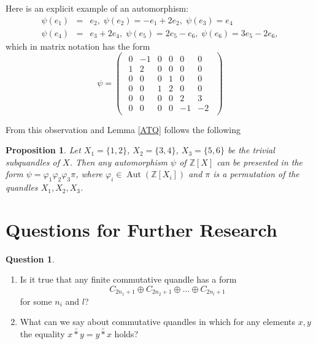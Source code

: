 \documentclass[12pt]{amsart}
\newtheorem{pro}[thm]{Proposition}
\theoremstyle{definition}
\newtheorem{qst}[thm]{Question}
\theoremstyle{remark}
\newcommand{\Z}{\mathbb{Z}}
\def\Aut{\operatorname{Aut}}
\begin{document}
Here is an explicit example of an automorphism: 
	  \begin{eqnarray}
	  \psi(e_1)&=&e_2, \; \psi(e_2)=-e_1+2e_2, \; \psi(e_3)=e_4 \nonumber\\
	  \psi(e_4)&=&e_3+2e_4, \; \psi(e_5)=2e_5-e_6, \; \psi(e_6)=3e_5-2e_6, \nonumber
	  \end{eqnarray}
which in matrix notation has the form
	  \begin{equation*}
\psi=\begin{pmatrix}
\begin{matrix} 
0 & -1&0 & 0 &0&0 \\
1&2& 0 & 0 &0&0 \\
0 & 0 &0 & 1 &0 & 0\\
0&0&1&2&0&0\\
0 & 0 &0&0 &2&3\\
0 & 0 &0&0 & -1 &-2
\end{matrix}
\end{pmatrix}
\end{equation*}



From this observation and Lemma \ref{ATQ} follows the following

\begin{pro}\label{AutX}
Let $X_1 = \{ 1, 2 \}$, $X_2 = \{ 3, 4 \}$,  $X_3 = \{ 5, 6\}$ be the trivial subquandles of $X$. Then any automorphism $\psi$ of $\Z[X]$ can be presented in the form $\psi = \varphi_1 \varphi_2 \varphi_3 \pi$, where $\varphi_i \in \Aut(\Z[X_i])$ and $\pi$ is a permutation of the quandles $X_1, X_2, X_3$.
\end{pro}








\section{Questions for Further Research}\label{Questions:}


\begin{qst}
\begin{enumerate}
\item
 Is it true that any finite commutative quandle has a form
$$
C_{2n_1+1} \oplus C_{2n_2+1} \oplus  \ldots  \oplus C_{2n_l+1} 
$$
for some $n_i$ and $l$?


\item
 What can we say about commutative quandles in which for any elements $x, y$ the equality $x \bar{*} y = y \bar{*}  x$  holds?
 \end{enumerate}
\end{qst}
\end{document}
